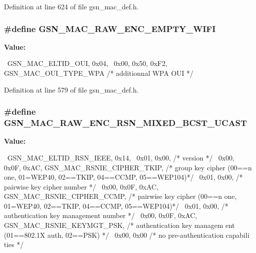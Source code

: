 Definition at line 624 of file gsn\_\-mac\_\-def.h.

\hypertarget{a00522_a45e2557a2f758ea4326592b4ffdb12d5}{
\subsubsection[{GSN\_\-MAC\_\-RAW\_\-ENC\_\-EMPTY\_\-WIFI}]{\setlength{\rightskip}{0pt plus 5cm}\#define GSN\_\-MAC\_\-RAW\_\-ENC\_\-EMPTY\_\-WIFI}}
\label{a00522_a45e2557a2f758ea4326592b4ffdb12d5}
{\bfseries Value:}
\begin{DoxyCode}
{{                                                                        \
    GSN_MAC_ELTID_OUI, 0x04,                                                  \
    0x00, 0x50, 0xF2, GSN_MAC_OUI_TYPE_WPA          /* additionnal WPA OUI */ \
}}
\end{DoxyCode}


Definition at line 579 of file gsn\_\-mac\_\-def.h.

\hypertarget{a00522_a2db75e20595a14ebbfc87cf7a4412275}{
\subsubsection[{GSN\_\-MAC\_\-RAW\_\-ENC\_\-RSN\_\-MIXED\_\-BCST\_\-UCAST}]{\setlength{\rightskip}{0pt plus 5cm}\#define GSN\_\-MAC\_\-RAW\_\-ENC\_\-RSN\_\-MIXED\_\-BCST\_\-UCAST}}
\label{a00522_a2db75e20595a14ebbfc87cf7a4412275}
{\bfseries Value:}
\begin{DoxyCode}
{{                                                                               
              \
    GSN_MAC_ELTID_RSN_IEEE, 0x14,                                                
                  \
    0x01, 0x00,                                 /* version                       
                                                */ \
    0x00, 0x0F, 0xAC, GSN_MAC_RSNIE_CIPHER_TKIP,    /* group key cipher    (00==n
      one, 01=WEP40, 02==TKIP, 04==CCMP, 05==WEP104)*/ \
    0x01, 0x00,                                 /* pairwise key cipher number    
                                                */ \
    0x00, 0x0F, 0xAC, GSN_MAC_RSNIE_CIPHER_CCMP,    /* pairwise key cipher (00==n
      one, 01=WEP40, 02==TKIP, 04==CCMP, 05==WEP104)*/ \
    0x01, 0x00,                                 /* authentication key management 
      number                                    */ \
    0x00, 0x0F, 0xAC, GSN_MAC_RSNIE_KEYMGT_PSK,     /* authentication key managem
      ent (01==802.1X auth, 02==PSK)                */ \
    0x00, 0x00                                  /* no pre-authentication capabili
      ties   */                                    \
}}
\end{DoxyCode}


